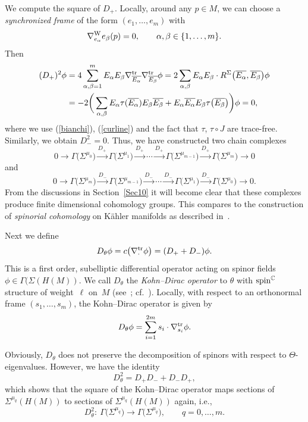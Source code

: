 \documentclass[10pt,a4paper]{amsart}
\numberwithin{equation}{section}
\newcommand{\CC}{\mathbb{C}}
\begin{document}
We compute the square of $D_+$. Locally, around any $p\in M$, we can choose a {\em synchronized frame} of the form $(e_1,\dots,e_m)$
with
\[
\nabla^{\rm W}_{e_\alpha}e_\beta(p) = 0,\qquad \alpha,\beta\in\{1,\dots,m\}.
\]
Then
\begin{align*}
(D_+)^2\phi &=
4\sum_{\alpha,\beta=1}^m E_\alpha E_\beta\nabla^{\rm tr}_{\overline{E_\alpha}}\nabla^{\rm tr}_{\overline{E_\beta}}\phi =
2\sum_{\alpha,\beta} E_\alpha E_\beta\cdot R^{\Sigma}\big(\overline{E_\alpha},\overline{E_\beta}\big)\phi\\
&= -2\bigg( \sum_{\alpha,\beta} E_\alpha\tau(\overline{E_\alpha})E_\beta\overline{E_\beta}+ E_\alpha\overline{E_\alpha}E_\beta\tau\big(\overline{E_\beta}\big) \bigg)\phi = 0,
\end{align*}
where we use (\ref{bianchi}), (\ref{curline}) and the fact that $\tau$, $\tau\circ J$ are trace-free.
Similarly, we obtain $D_-^2=0$. Thus, we have constructed two chain complexes
\begin{equation}\label{spincpx}
0\to \Gamma\big(\Sigma^{\mu_0}\big)\stackrel{D_+}{\longrightarrow}\Gamma\big(\Sigma^{\mu_1}\big)\stackrel{D_+}{\longrightarrow} \cdots\stackrel{D_+}{\longrightarrow}\Gamma\big(\Sigma^{\mu_{m-1}}\big)
\stackrel{D_+}{\longrightarrow}\Gamma\big(\Sigma^{\mu_m}\big)\to 0
\end{equation}
and
\[
0\to \Gamma\big(\Sigma^{\mu_m}\big)\stackrel{D_-}{\longrightarrow} \Gamma\big(\Sigma^{\mu_{m-1}}\big)\stackrel{D_-}{\longrightarrow}\cdots\stackrel{D_-}{\longrightarrow}\Gamma\big(\Sigma^{\mu_{1}}\big)
\stackrel{D_-}{\longrightarrow}\Gamma\big(\Sigma^{\mu_0}\big)\to 0.
\]
From the discussions in Section~\ref{Sec10} it will become clear that these complexes produce finite dimensional cohomology groups.
This compares to the construction of {\em spinorial cohomology} on K\"ahler manifolds as described in~\cite{Mic}.

Next we define
\[
D_\theta\phi = c\big(\nabla_{\cdot}^{\rm tr}\phi\big) = (D_++D_-)\phi.
\]
This  is a first order, subelliptic differential operator acting on spinor fields $\phi\in\Gamma(\Sigma(H(M))$.
We call $D_\theta$ the {\em Kohn--Dirac operator} to $\theta$ with ${\rm spin}^\CC$ structure of weight~$\ell$ on~$M$ (see~\cite{Pet}; cf.~\cite{LeiN1, Stadt}).
Locally, with respect to an orthonormal frame $(s_1,\dots,s_m)$, the Kohn--Dirac operator is given by
\[
D_\theta\phi = \sum_{i=1}^{2m} s_i\cdot \nabla^{\rm tr}_{s_i}\phi.
\]

Obviously, $D_\theta$ does not preserve the decomposition of spinors with respect to $\Theta$-eigenvalues.
However, we have the identity
\[
D^2_\theta = D_+D_- + D_-D_+,
\]
which shows that the square of the Kohn--Dirac operator maps sections
of $\Sigma^{\mu_q}(H(M))$ to sections of $\Sigma^{\mu_q}(H(M))$ again, i.e.,
\[D_\theta^2\colon \ \Gamma\big(\Sigma^{\mu_q}\big)\to \Gamma\big(\Sigma^{\mu_q}\big),\qquad q=0,\dots,m.\]
\end{document}
